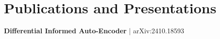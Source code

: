 \documentclass[a4paper,10pt]{article}
\begin{document}

\section*{Publications and Presentations}
\textbf{Differential Informed Auto-Encoder} | arXiv:2410.18593  \\



\end{document}
